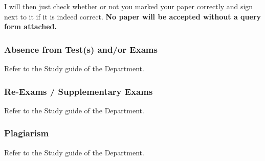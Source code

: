             I will then just check whether or not you marked your paper
            correctly and sign next to it if it is indeed correct.
            \textbf{No paper will be accepted without a query form attached.}

        \subsubsection{Absence from Test(s) and/or Exams}
            Refer to the Study guide of the Department.

        \subsubsection{Re-Exams / Supplementary Exams}
            Refer to the Study guide of the Department.

        \subsubsection{Plagiarism}
            Refer to the Study guide of the Department.
